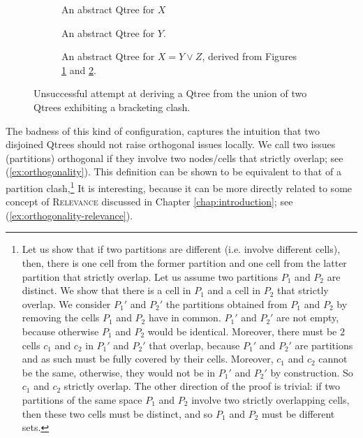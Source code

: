 \begin{figure}[H]
	\centering
	\begin{subfigure}[t]{.3\linewidth}
		\centering
		\caption{An abstract Qtree for $X$}\label{fig:qtree-y'}
	\end{subfigure}
	\hfill
	\begin{subfigure}[t]{.3\linewidth}
		\centering{}
		\caption{An abstract Qtree for $Y$.}\label{fig:qtree-z'}
	\end{subfigure}
	\hfill
	\begin{subfigure}[t]{.3\linewidth}
		\centering{}
		\caption{An abstract Qtree for $X = Y \vee Z$, derived from Figures \ref{fig:qtree-y'} and \ref{fig:qtree-z'}.}\label{fig:qtree-xy-disj-degenerate}
	\end{subfigure}
	\caption{Unsuccessful attempt at deriving a Qtree from the union of two Qtrees exhibiting a bracketing clash.}\label{fig:qtree-x-y-z-disj-degenerate}
\end{figure}

The badness of this kind of configuration, captures the intuition that two disjoined Qtrees should not raise orthogonal issues locally. We call two issues (partitions) orthogonal if they involve two nodes/cells that strictly overlap; see (\ref{ex:orthogonality}). This definition can be shown to be equivalent to that of a partition clash,\footnote{Let us show that if two partitions are different (i.e. involve different cells), then, there is one cell from the former partition and one cell from the latter partition that strictly overlap. Let us assume two partitions $P_1$ and $P_2$ are distinct. We show that there is a cell in $P_1$ and a cell in $P_2$ that strictly overlap. We consider $P_1'$ and $P_2'$ the partitions obtained from  $P_1$ and $P_2$ by removing the cells $P_1$ and $P_2$ have in common. $P_1'$ and $P_2'$ are not empty, because otherwise $P_1$ and $P_2$ would be identical. Moreover, there must be $2$ cells $c_1$ and $c_2$ in $P_1'$ and $P_2'$ that overlap, because $P_1'$ and $P_2'$ are partitions and as such must be fully covered by their cells. Moreover, $c_1$ and $c_2$ cannot be the same, otherwise, they would not be in $P_1'$ and $P_2'$ by construction. So $c_1$ and $c_2$ strictly overlap. The other direction of the proof is trivial: if two partitions of the same space $P_1$ and $P_2$ involve two strictly overlapping cells, then these two cells must be distinct, and so $P_1$ and $P_2$ must be different sets.} It is interesting, because it can be more directly related to some concept of \textsc{Relevance} discussed in Chapter \ref{chap:introduction}; see (\ref{ex:orthogonality-relevance}).

